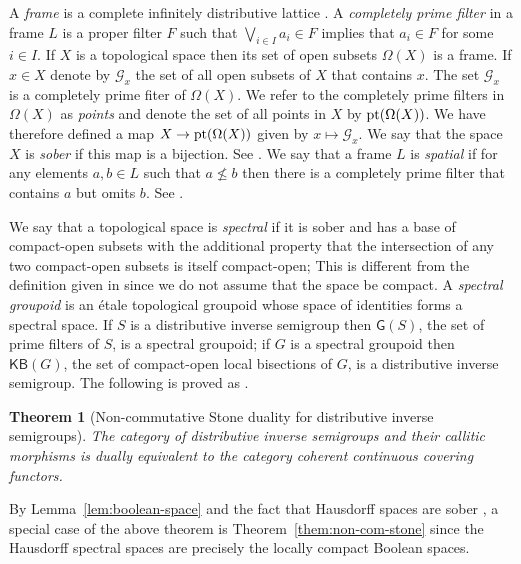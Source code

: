 \documentclass[a4paper]{amsart}
\newtheorem{theorem}{Theorem}[section]
\begin{document}
A {\em frame} is a complete infinitely distributive lattice \cite[Page 39]{Johnstone}.
A {\em completely prime filter} in a frame $L$ is a proper filter $F$ such that
$\bigvee_{i \in I} a_{i} \in F$ implies that $a_{i} \in F$ for some $i \in I$.
If $X$ is a topological space then its set of open subsets $\Omega (X)$ is a frame.
If $x \in X$ denote by $\mathscr{G}_{x}$ the set of all open subsets of $X$ that contains $x$.
The set  $\mathscr{G}_{x}$ is a completely prime fiter of $\Omega (X)$.
We refer to the completely prime filters in $\Omega (X)$ as {\em points}
and denote the set of all points in $X$ by $\mbox{\rm pt}(\Omega (X))$.
We have therefore defined a map $X \rightarrow \mbox{\rm pt}(\Omega (X))$
given by $x \mapsto \mathscr{G}_{x}$.
We say that the space $X$ is {\em sober} if this map is a bijection.
See \cite[Page 43]{Johnstone}. 
We say that a frame $L$ is {\em spatial} if for any elements $a,b \in L$
such that $a \nleq b$ then there is a completely prime filter that contains $a$ but omits $b$.
See \cite[Page 43]{Johnstone}.

We say that a topological space is {\em spectral} if it is sober and has a base of compact-open subsets with the additional property that the intersection
of any two compact-open subsets is itself compact-open;
This is different from the definition given in \cite{Johnstone} since we do not assume that the space be compact.
A {\em spectral groupoid} is an \'etale topological groupoid whose space of identities forms a spectral space.
If $S$ is a distributive inverse semigroup then $\mathsf{G}(S)$, the set of prime filters of $S$,
is a spectral groupoid; if $G$ is a spectral groupoid then $\mathsf{KB}(G)$, the set of compact-open local bisections of $G$,
is a distributive inverse semigroup.
The following is proved as \cite[Theorem 3.17]{LL}.

\begin{theorem}[Non-commutative Stone duality for distributive inverse semigroups]\label{them:dist-stone}
The category of distributive inverse semigroups and their callitic morphisms is dually 
equivalent to the category coherent continuous covering functors.
\end{theorem}

By Lemma~\ref{lem:boolean-space} and the fact that Hausdorff spaces are sober \cite[part (ii) of Lemma II.1.6]{Johnstone}, 
a special case of the above theorem is Theorem~\ref{them:non-com-stone}
since the Hausdorff spectral spaces are precisely the locally compact Boolean spaces.
\end{document}
